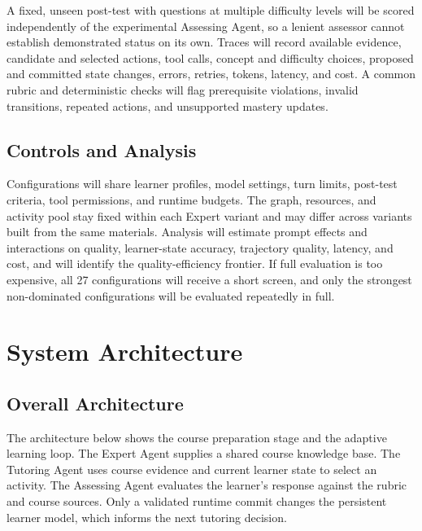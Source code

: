 \documentclass{article}
\begin{document}
A fixed, unseen post-test with questions at multiple difficulty levels will be scored independently of the experimental Assessing Agent, so a lenient assessor cannot establish demonstrated status on its own. Traces will record available evidence, candidate and selected actions, tool calls, concept and difficulty choices, proposed and committed state changes, errors, retries, tokens, latency, and cost. A common rubric and deterministic checks will flag prerequisite violations, invalid transitions, repeated actions, and unsupported mastery updates.

\subsection{Controls and Analysis}

Configurations will share learner profiles, model settings, turn limits, post-test criteria, tool permissions, and runtime budgets. The graph, resources, and activity pool stay fixed within each Expert variant and may differ across variants built from the same materials. Analysis will estimate prompt effects and interactions on quality, learner-state accuracy, trajectory quality, latency, and cost, and will identify the quality-efficiency frontier. If full evaluation is too expensive, all 27 configurations will receive a short screen, and only the strongest non-dominated configurations will be evaluated repeatedly in full.

\label{main-end}

\clearpage

\appendix

\section{System Architecture}

\subsection{Overall Architecture}

The architecture below shows the course preparation stage and the adaptive learning loop. The Expert Agent supplies a shared course knowledge base. The Tutoring Agent uses course evidence and current learner state to select an activity. The Assessing Agent evaluates the learner's response against the rubric and course sources. Only a validated runtime commit changes the persistent learner model, which informs the next tutoring decision.
\end{document}
